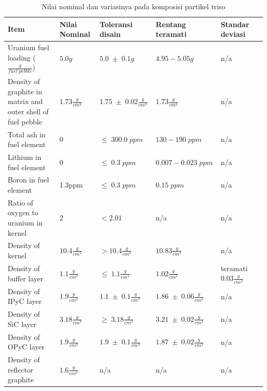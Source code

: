 \documentclass[a4paper,11pt]{report}
\newcommand{\ra}[1]{\renewcommand{\arraystretch}{#1}}
\begin{document}
\begin{table}[h!] %
  \begin{center}
\caption[Nilai nominal dan variasinya pada komposisi partikel triso]{Nilai nominal dan variasinya pada komposisi partikel triso\cite{report2}}  
\label{tab:variasi}
\scriptsize
\ra{1.3}
  \begin{tabular}{p{4.5cm}p{1.8cm}p{2cm}p{2.6cm}p{2cm}p{2cm}} \toprule
Item & Nilai Nominal & Toleransi disain & Rentang teramati & Standar deviasi \\ \midrule
Uranium fuel loading ($\frac{g}{fuel\;pebble}$) & $5.0g$ & $5.0\;\pm\;0.1g$ & $4.95-5.05g$ & n/a \\
Density of graphite in matrix and outer shell of fuel pebble & $1.73\frac{g}{cm^3}$ & $1.75\;\pm\;0.02\frac{g}{cm^3}$ & $1.73\frac{g}{cm^3}$ & n/a \\
Total ash in fuel element & $0$ & $\leq\;300.0\;ppm$ & $130-190\;ppm$ & n/a \\
Lithium in fuel element & $0$ & $\leq\;0.3\;ppm$ & $0.007-0.023\;ppm$ & n/a \\
Boron in fuel element & 1.3\;ppm & $\leq\;0.3\;ppm$ & $0.15\;ppm$ & n/a \\
Ratio of oxygen to uranium in kernel & 2 & $<2.01$ & n/a & n/a \\
Density of kernel & $10.4\frac{g}{cm^3}$ & $>10.4\frac{g}{cm^3}$ & $10.83\frac{g}{cm^3}$ & n/a \\
Density of buffer layer & $1.1\frac{g}{cm^3}$ & $\leq\;1.1\frac{g}{cm^3}$ & $1.02\frac{g}{cm^3}$ & teramati $0.03\frac{g}{cm^3}$\\
Density of IPyC layer & $1.9\frac{g}{cm^3}$ & $1.1\;\pm\;0.1\frac{g}{cm^3}$ & $1.86\;\pm\;0.06\frac{g}{cm^3}$ & n/a \\
Density of SiC layer & $3.18\frac{g}{cm^3}$ & $\geq\;3.18\frac{g}{cm^3}$ & $3.21\;\pm\;0.02\frac{g}{cm^3}$ & n/a \\
Density of OPyC layer & $1.9\frac{g}{cm^3}$ & $1.9\;\pm\;0.1\frac{g}{cm^3}$ & $1.87\;\pm\;0.02\frac{g}{cm^3}$ & n/a \\
Density of reflector graphite & $1.6\frac{g}{cm^3}$ & n/a & n/a & n/a \\
\bottomrule
\end{tabular}
\end{center}
\end{table}
\normalsize
\end{document}
